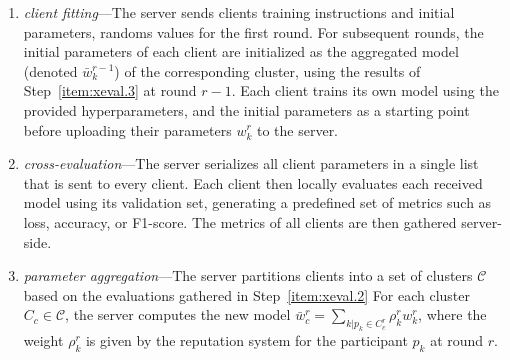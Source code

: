 \begin{enumerate}[1.]
  \item \emph{client fitting}---The server sends clients training instructions and initial parameters, \ie randoms values for the first round.
  For subsequent rounds, the initial parameters of each client are initialized as the aggregated model (denoted $\bar{w}_k^{r-1}$) of the corresponding cluster, using the results of Step~\ref{item:xeval.3} at round $r-1$.
  Each client trains its own model using the provided hyperparameters, and the initial parameters as a starting point before uploading their parameters $w_k^r$ to the server.
  \label{item:xeval.1}
  
  \item \emph{cross-evaluation}---The server serializes all client parameters in a single list that is sent to every client. 
  Each client then locally evaluates each received model using its validation set, generating a predefined set of metrics such as loss, accuracy, or F1-score.
  The metrics of all clients are then gathered server-side.
  \label{item:xeval.2}
  
  \item \emph{parameter aggregation}---The server partitions clients into a set of clusters $\mathscr{C}$ based on the evaluations gathered in Step~\ref{item:xeval.2}
  For each cluster $C_c \in \mathscr{C}$, the server computes the new model $\bar{w}_c^r = \sum_{k | p_k \in C_c^r} \rho_k^r w_k^r$, where the weight $\rho_k^r$ is given by the reputation system for the participant $p_k$ at round $r$.
  \label{item:xeval.3}

\end{enumerate}


  
